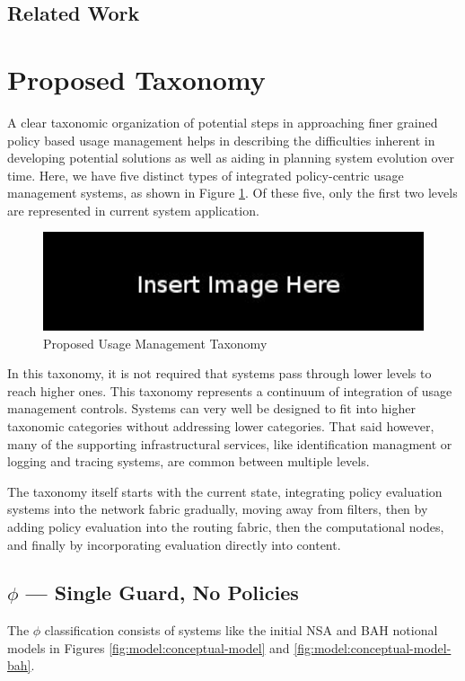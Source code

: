 \documentclass[12pt,letterpaper]{article}
\begin{document}
\subsection{Related Work}

\section{Proposed Taxonomy}
A clear taxonomic organization of potential steps in approaching finer grained policy based usage management helps in describing the difficulties inherent in developing potential solutions as well as aiding in planning system evolution over time. Here, we have five distinct types of integrated policy-centric usage management systems, as shown in Figure \ref{fig:model:taxonomy}.  Of these five, only the first two levels are represented in current system application.

\begin{figure}[!t]
\centering
\includegraphics[width=5in]{blank}
\caption{Proposed Usage Management Taxonomy}
\label{fig:model:taxonomy}
\end{figure}

In this taxonomy, it is not required that systems pass through lower levels to reach higher ones.  This taxonomy represents a continuum of integration of usage management controls.  Systems can very well be designed to fit into higher taxonomic categories without addressing lower categories.  That said however, many of the supporting infrastructural services, like identification managment or logging and tracing systems, are common between multiple levels.

The taxonomy itself starts with the current state, integrating policy evaluation systems into the network fabric gradually, moving away from filters, then by adding policy evaluation into the routing fabric, then the computational nodes, and finally by incorporating evaluation directly into content.

\subsection{$\phi$ --- Single Guard, No Policies}
The $\phi$ classification consists of systems like the initial NSA and BAH notional models in Figures \ref{fig:model:conceptual-model} and \ref{fig:model:conceptual-model-bah}.
\end{document}
